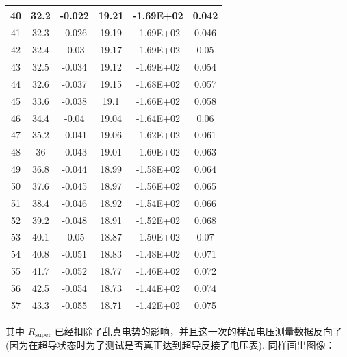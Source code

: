 \documentclass{THUexprep}
\begin{document}
\begin{longtable}{|c|c|c|c|c|c|}
    40    & 32.2  & -0.022 & 19.21 & -1.69E+02 & 0.042 \\
    \hline
    41    & 32.3  & -0.026 & 19.19 & -1.69E+02 & 0.046 \\
    \hline
    42    & 32.4  & -0.03 & 19.17 & -1.69E+02 & 0.05 \\
    \hline
    43    & 32.5  & -0.034 & 19.12 & -1.69E+02 & 0.054 \\
    \hline
    44    & 32.6  & -0.037 & 19.15 & -1.68E+02 & 0.057 \\
    \hline
    45    & 33.6  & -0.038 & 19.1  & -1.66E+02 & 0.058 \\
    \hline
    46    & 34.4  & -0.04 & 19.04 & -1.64E+02 & 0.06 \\
    \hline
    47    & 35.2  & -0.041 & 19.06 & -1.62E+02 & 0.061 \\
    \hline
    48    & 36    & -0.043 & 19.01 & -1.60E+02 & 0.063 \\
    \hline
    49    & 36.8  & -0.044 & 18.99 & -1.58E+02 & 0.064 \\
    \hline
    50    & 37.6  & -0.045 & 18.97 & -1.56E+02 & 0.065 \\
    \hline
    51    & 38.4  & -0.046 & 18.92 & -1.54E+02 & 0.066 \\
    \hline
    52    & 39.2  & -0.048 & 18.91 & -1.52E+02 & 0.068 \\
    \hline
    53    & 40.1  & -0.05 & 18.87 & -1.50E+02 & 0.07 \\
    \hline
    54    & 40.8  & -0.051 & 18.83 & -1.48E+02 & 0.071 \\
    \hline
    55    & 41.7  & -0.052 & 18.77 & -1.46E+02 & 0.072 \\
    \hline
    56    & 42.5  & -0.054 & 18.73 & -1.44E+02 & 0.074 \\
    \hline
    57    & 43.3  & -0.055 & 18.71 & -1.42E+02 & 0.075 \\
    \hline
\end{longtable}

其中 $R_\text{super}$ 已经扣除了乱真电势的影响，并且这一次的样品电压测量数据反向了 (因为在超导状态时为了测试是否真正达到超导反接了电压表). 同样画出图像：
\end{document}

